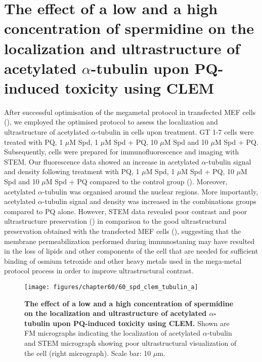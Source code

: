 \section{The effect of a low and a high concentration of spermidine on the localization and ultrastructure of acetylated $\alpha$-tubulin upon PQ-induced toxicity using CLEM}
\label{sec:Effect_low_high_spermidine_localization_ultrastructure of_tubulin_CLEM}
After successful optimisation of the megametal protocol in transfected MEF cells (), we employed the optimised protocol to assess the localization and ultrastructure of acetylated $\alpha$-tubulin in cells upon treatment. GT 1-7 cells were treated with PQ, 1 $\mu$M Spd, 1 $\mu$M Spd + PQ, 10 $\mu$M Spd and 10 $\mu$M Spd + PQ. Subsequently, cells were prepared for immunofluorescence and imaging with STEM. Our fluorescence data showed an increase in acetylated $\alpha$-tubulin signal and density following treatment with PQ, 1 $\mu$M Spd, 1 $\mu$M Spd + PQ, 10 $\mu$M Spd and 10 $\mu$M Spd + PQ compared to the control group (). Moreover, acetylated $\alpha$-tubulin was organised around the nuclear regions. More importantly, acetylated $\alpha$-tubulin signal and density was increased in the combinations groups compared to PQ alone. However, STEM data revealed poor contrast and poor ultrastructure preservation () in comparison to the good ultrastructural preservation obtained with the transfected MEF cells (), suggesting that the membrane permeabilization performed during immunostaning may have resulted in the loss of lipids and other components of the cell that are needed for sufficient binding of osmium tetroxide and other heavy metals used in the mega-metal protocol process in order to improve ultrastructural contrast. 

\begin{landscape}
\begin{figure}[!htbp]
\center
 \texttt{[image: figures/chapter60/60\_spd\_clem\_tubulin\_a]}
 \caption[The effect of a low and a high concentration of spermidine on the localization and ultrastructure of acetylated $\alpha$-tubulin upon PQ-induced toxicity using CLEM]{\textbf{The effect of a low and a high concentration of spermidine on the localization and ultrastructure of acetylated $\alpha$-tubulin upon PQ-induced toxicity using CLEM.} Shown are FM micrographs indicating the localization of acetylated $\alpha$-tubulin and STEM micrograph showing poor ultrastructural visualization of the cell (right micrograph). Scale bar: 10 $\mu$m.}
 \label{fig:60_spd_clem_tubulin_a}
\end{figure} 
\end{landscape}

